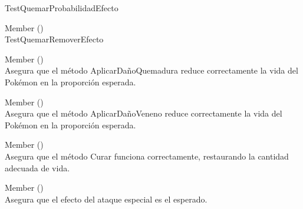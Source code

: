 \begin{DoxyRefList}
\label{test__test000023}%
%
Test\+Quemar\+Probabilidad\+Efecto  
\item[Member \doxylink{class_ucu_1_1_poo_1_1_discord_bot_1_1_domain_1_1_tests_1_1_tests_efectos_ataque_1_1_test_efectos_ataque_a88d4d5c49cda05eddaec995819675ade}{Ucu.Poo.Discord\+Bot.Domain.Tests.Tests\+Efectos\+Ataque.Test\+Efectos\+Ataque.Test\+Quemar\+Remover\+Efecto} ()]\hfill \\
\label{test__test000025}%
%
Test\+Quemar\+Remover\+Efecto  
\item[Member \doxylink{class_ucu_1_1_poo_1_1_discord_bot_1_1_domain_1_1_tests_1_1_tests_general_1_1_test_pokemon_1_1_test_pokemon_a3c38345f32ac6d58a8ac17b2446c4d0e}{Ucu.Poo.Discord\+Bot.Domain.Tests.Tests\+General.Test\+Pokemon.Test\+Pokemon.Test\+Aplicar\+Daño\+Quemadura} ()]\hfill \\
\label{test__test000004}%
%
 Asegura que el método {\ttfamily Aplicar\+Daño\+Quemadura} reduce correctamente la vida del Pokémon en la proporción esperada.  
\item[Member \doxylink{class_ucu_1_1_poo_1_1_discord_bot_1_1_domain_1_1_tests_1_1_tests_general_1_1_test_pokemon_1_1_test_pokemon_ab04e2b3596f4759aaab0379818073bec}{Ucu.Poo.Discord\+Bot.Domain.Tests.Tests\+General.Test\+Pokemon.Test\+Pokemon.Test\+Aplicar\+Daño\+Veneno} ()]\hfill \\
\label{test__test000005}%
%
 Asegura que el método {\ttfamily Aplicar\+Daño\+Veneno} reduce correctamente la vida del Pokémon en la proporción esperada.  
\item[Member \doxylink{class_ucu_1_1_poo_1_1_discord_bot_1_1_domain_1_1_tests_1_1_tests_general_1_1_test_pokemon_1_1_test_pokemon_ac91f48a71a8afd49e9645d64bdb6351b}{Ucu.Poo.Discord\+Bot.Domain.Tests.Tests\+General.Test\+Pokemon.Test\+Pokemon.Test\+Curar} ()]\hfill \\
\label{test__test000006}%
%
 Asegura que el método {\ttfamily Curar} funciona correctamente, restaurando la cantidad adecuada de vida.  
\item[Member \doxylink{class_ucu_1_1_poo_1_1_discord_bot_1_1_domain_1_1_tests_1_1_tests_general_1_1_test_pokemon_1_1_test_pokemon_ac02a4b524af7d409185f4d3f9c17a104}{Ucu.Poo.Discord\+Bot.Domain.Tests.Tests\+General.Test\+Pokemon.Test\+Pokemon.Test\+Efecto\+Ataque} ()]\hfill \\
\label{test__test000001}%
%
Asegura que el efecto del ataque especial es el esperado.  

\end{DoxyRefList}
